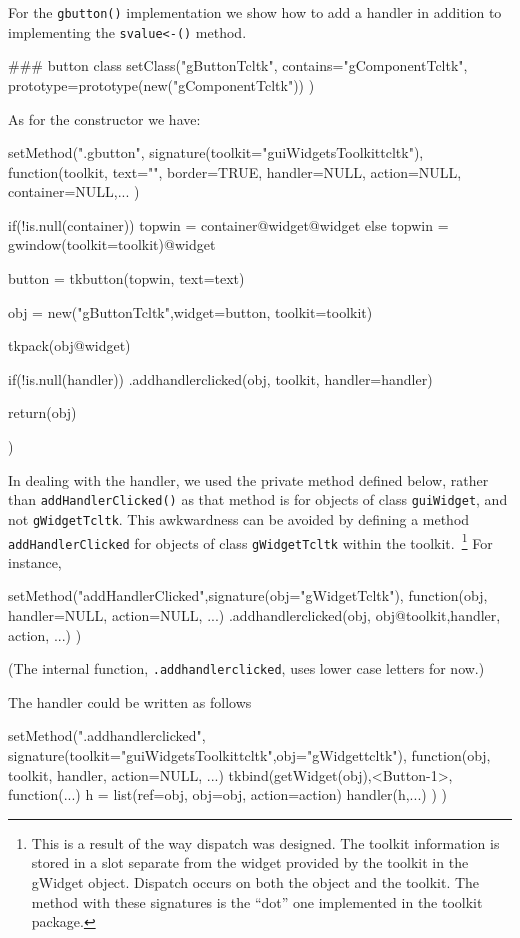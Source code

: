 \documentclass[12pt]{article}
\newcommand{\RCode}[1]{\texttt{#1}}
\newcommand{\RFunc}[1]{\texttt{#1()}}
\begin{document}
For the \RFunc{gbutton} implementation we show how to add a handler in
addition to implementing the \RFunc{svalue<-} method.

\begin{Scode}
  ### button class
  setClass("gButtonTcltk",
  contains="gComponentTcltk",
  prototype=prototype(new("gComponentTcltk"))
  )
\end{Scode}

As for the constructor we have:
\begin{Scode}
  setMethod(".gbutton",
  signature(toolkit="guiWidgetsToolkittcltk"),
  function(toolkit,
  text="", border=TRUE, handler=NULL, action=NULL, container=NULL,...
  ) {
    
    if(!is.null(container)) {
      topwin = container@widget@widget
    } else {
      topwin = gwindow(toolkit=toolkit)@widget
    }
    
    button = tkbutton(topwin, text=text)
    
    obj = new("gButtonTcltk",widget=button, toolkit=toolkit)
  
    tkpack(obj@widget)
    
    if(!is.null(handler))
    .addhandlerclicked(obj, toolkit, handler=handler)
    
    return(obj)
    
  })
\end{Scode}
In dealing with the handler, we used the private method defined below,
rather than \RFunc{addHandlerClicked} as that method is for objects of
class \RCode{guiWidget}, and not \RCode{gWidgetTcltk}. This awkwardness
can be avoided by defining a method \RCode{addHandlerClicked} for
objects of class \RCode{gWidgetTcltk} within the
toolkit.~\footnote{This is a result of the way dispatch was
  designed. The toolkit information is stored in a slot separate from
  the widget provided by the toolkit in the gWidget object. Dispatch
  occurs on both the object and the toolkit. The method with these
  signatures is the ``dot'' one implemented in the toolkit package.} For instance,

\begin{Scode}
setMethod("addHandlerClicked",signature(obj="gWidgetTcltk"),
          function(obj, handler=NULL, action=NULL, ...) {
            .addhandlerclicked(obj, obj@toolkit,handler, action, ...)
          })
\end{Scode}
(The internal function, \RCode{.addhandlerclicked}, uses lower case
letters for now.)

The handler could be written as follows
\begin{Scode}
setMethod(".addhandlerclicked",
          signature(toolkit="guiWidgetsToolkittcltk",obj="gWidgettcltk"),
          function(obj, toolkit,
                   handler, action=NULL, ...) {
                     tkbind(getWidget(obj),<Button-1>,
                     function(...) {
                       h = list(ref=obj, obj=obj, action=action)
                       handler(h,...)
                     })
})
\end{Scode}
\end{document}
